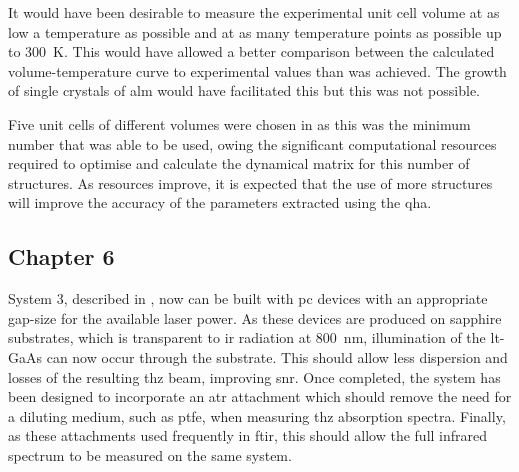 It would have been desirable to measure the experimental unit cell volume at as low a temperature as possible and at as many temperature points as possible up to \SI{300}{K}. This would have allowed a better comparison between the calculated volume\nobreakdash-temperature curve to experimental values than was achieved. The growth of single crystals of \acrshort{alm} would have facilitated this but this was not possible. 

Five unit cells of different volumes were chosen in  as this was the minimum number that was able to be used, owing the significant computational resources required to optimise and calculate the dynamical matrix for this number of structures. As resources improve, it is expected that the use of more structures will improve the accuracy of the parameters extracted using the \acrshort{qha}.

\subsection{Chapter 6}
System 3, described in , now can be built with \acrshort{pc} devices with an appropriate gap\nobreakdash-size for the available laser power. As these devices are produced on sapphire substrates, which is transparent to \acrshort{ir} radiation at \SI{800}{nm}, illumination of the \acrshort{lt}\nobreakdash-GaAs can now occur through the substrate. This should allow less dispersion and losses of the resulting \acrshort{thz} beam, improving \acrshort{snr}. Once completed, the system has been designed to incorporate an \acrshort{atr} attachment which should remove the need for a diluting medium, such as \acrshort{ptfe}, when measuring \acrshort{thz} absorption spectra. Finally, as these attachments used frequently in \acrshort{ftir}, this should allow the full infrared spectrum to be measured on the same system. 